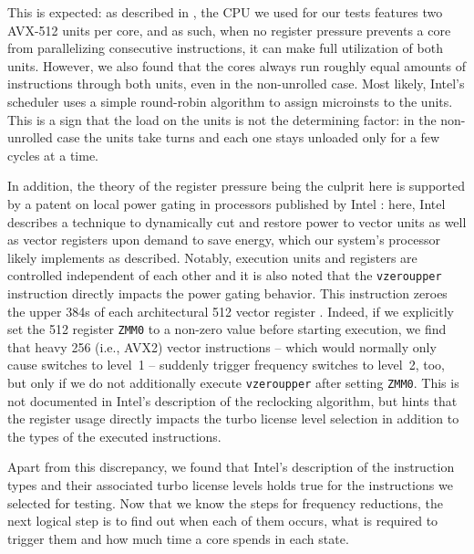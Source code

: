 This is expected: as described in , the \gls{CPU} we used for our tests features two \gls{AVX-512} units per core, and as such, when no register pressure prevents a core from parallelizing consecutive instructions, it can make full utilization of both units. However, we also found that the cores always run roughly equal amounts of instructions through both units, even in the non-unrolled case. Most likely, Intel's scheduler uses a simple round-robin algorithm to assign \glspl{microinst} to the units. This is a sign that the load on the units is not the determining factor: in the non-unrolled case the units take turns and each one stays unloaded only for a few cycles at a time.

In addition, the theory of the register pressure being the culprit here is supported by a patent on local power gating in processors published by Intel \cite{bonen2016performing}: here, Intel describes a technique to dynamically cut and restore power to vector units as well as vector registers upon demand to save energy, which our system's processor likely implements as described. Notably, execution units and registers are controlled independent of each other and it is also noted that the \texttt{vzeroupper} instruction directly impacts the power gating behavior. This instruction zeroes the upper \SI{384}{\bit}s of each architectural \SI[number-unit-product=-]{512}{\bit} vector register \cite{intelsdminstructionreference}. Indeed, if we explicitly set the \SI[number-unit-product=-]{512}{\bit} register \texttt{ZMM0} to a non-zero value before starting execution, we find that heavy \SI[number-unit-product=-]{256}{\bit} (i.e., \gls{AVX2}) vector instructions -- which would normally only cause switches to level~1 -- suddenly trigger frequency switches to level~2, too, but only if we do not additionally execute \texttt{vzeroupper} after setting \texttt{ZMM0}. This is not documented in Intel's description of the reclocking algorithm, but hints that the register usage directly impacts the turbo license level selection in addition to the types of the executed instructions.

Apart from this discrepancy, we found that Intel's description of the instruction types and their associated turbo license levels holds true for the instructions we selected for testing. Now that we know the steps for frequency reductions, the next logical step is to find out when each of them occurs, what is required to trigger them and how much time a core spends in each state.

